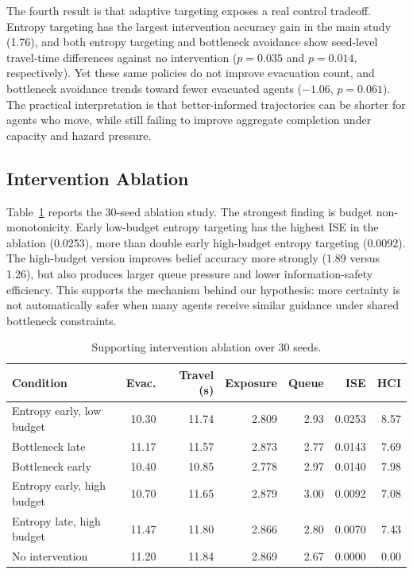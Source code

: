 The fourth result is that adaptive targeting exposes a real control tradeoff.
Entropy targeting has the largest intervention accuracy gain in the main study
(1.76), and both entropy targeting and bottleneck avoidance show seed-level
travel-time differences against no intervention
($p=0.035$ and $p=0.014$, respectively). Yet these same policies do not improve
evacuation count, and bottleneck avoidance trends toward fewer evacuated agents
($-1.06$, $p=0.061$). The practical interpretation is that better-informed
trajectories can be shorter for agents who move, while still failing to improve
aggregate completion under capacity and hazard pressure.

\subsection{Intervention Ablation}
\label{subsec:ablation-results}

Table~\ref{tab:ablation} reports the 30-seed ablation study. The strongest
finding is budget non-monotonicity. Early low-budget entropy targeting has the
highest ISE in the ablation (0.0253), more than double early high-budget
entropy targeting (0.0092). The high-budget version improves belief accuracy
more strongly (1.89 versus 1.26), but also produces larger queue pressure and
lower information-safety efficiency. This supports the mechanism behind our
hypothesis: more certainty is not automatically safer when many agents receive
similar guidance under shared bottleneck constraints.

\begin{table}[!t]
\centering
\caption{Supporting intervention ablation over 30 seeds.}
\label{tab:ablation}
\begin{tabular}{lrrrrrr}
\toprule
Condition & Evac. & Travel (s) & Exposure & Queue & ISE & HCI \\
\midrule
Entropy early, low budget & 10.30 & 11.74 & 2.809 & 2.93 & 0.0253 & 8.57 \\
Bottleneck late & 11.17 & 11.57 & 2.873 & 2.77 & 0.0143 & 7.69 \\
Bottleneck early & 10.40 & 10.85 & 2.778 & 2.97 & 0.0140 & 7.98 \\
Entropy early, high budget & 10.70 & 11.65 & 2.879 & 3.00 & 0.0092 & 7.08 \\
Entropy late, high budget & 11.47 & 11.80 & 2.866 & 2.80 & 0.0070 & 7.43 \\
No intervention & 11.20 & 11.84 & 2.869 & 2.67 & 0.0000 & 0.00 \\
\bottomrule
\end{tabular}
\end{table}

